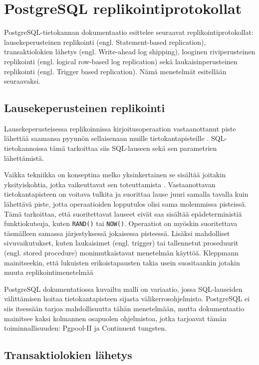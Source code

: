 \documentclass[finnish,twoside,censored,csm,sw-track-2018]{HYthesisML}
\begin{document}
\section{PostgreSQL replikointiprotokollat}

PostgreSQL-tietokannan dokumentaatio esittelee seuraavat replikointiprotokollat: lausekeperusteinen replikointi (engl. Statement-based replication), transaktiolokien lähetys (engl. Write-ahead log shipping), looginen riviperusteinen replikointi (engl. logical row-based log replication) sekä laukaisinperusteinen replikointi (engl. Trigger based replication). Nämä menetelmät esitellään seuraavaksi.

\subsection{Lausekeperusteinen replikointi}
\label{sec-statement-based-replication}

Lausekeperusteisessa replikoinnissa kirjoitusoperaation vastaanottanut piste lähettää saamansa pyynnön sellaisenaan muille tietokantapisteille \cite{Kleppmann}. SQL-tietokannoissa tämä tarkoittaa siis SQL-lauseen sekä sen parametrien lähettämistä.

Vaikka tekniikka on konseptina melko yksinkertainen se sisältää joitakin yksityiskohtia, jotka vaikeuttavat sen toteuttamista \cite{Kleppmann}. Vastaanottavan tietokantapisteen on voitava tulkita ja suorittaa lause juuri samalla tavalla kuin lähettävä piste, jotta operaatioiden lopputulos olisi sama molemmissa pisteissä. Tämä tarkoittaa, että suoritettavat lauseet eivät saa sisältää epädeterministiä funktiokutsuja, kuten \verb+RAND()+ tai \verb+NOW()+. Operaatiot on myöskin suoritettava täsmälleen samassa järjestyksessä jokaisessa pisteessä. Lisäksi mahdolliset sivuvaikutukset, kuten laukaisimet (engl. trigger) tai tallennetut proseduurit (engl. stored procedure) monimutkaistavat menetelmän käyttöä. Kleppmann mainitseekin, että lukuisten erikoistapausten takia usein suositaankin jotakin muuta replikointimenetelmää \citep{Kleppmann}

PostgreSQL dokumentatiossa \citep{postgres-replication-solutions} kuvailtu malli on variaatio, jossa SQL-lauseiden välittämisen hoitaa tietokantapisteen sijasta välikerrosohjelmisto. PostgreSQL ei siis itsessään tarjoa mahdollisuutta tähän menetelmään, mutta dokumentaatio mainitsee kaksi kolmannen osapuolen ohjelmistoa, jotka tarjoavat tämän toiminnallisuuden: Pgpool-II ja Continuent tungsten.

\subsection{Transaktiolokien lähetys}
\end{document}
